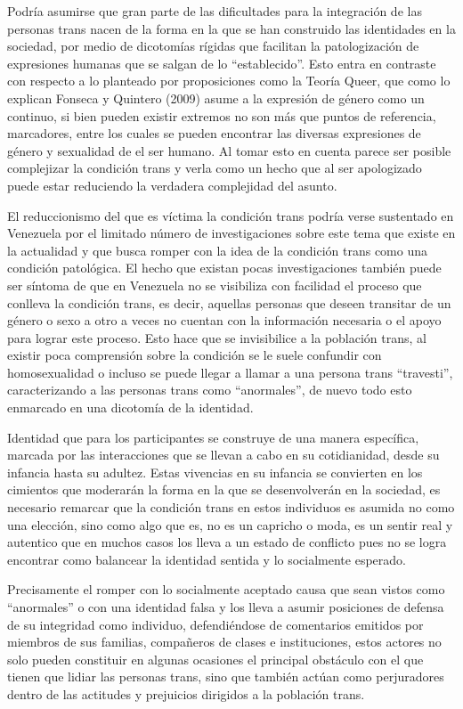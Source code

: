 Podría asumirse que gran parte de las dificultades para la integración de las
personas trans nacen de la forma en la que se han construido las identidades en
la sociedad, por medio de dicotomías rígidas que facilitan la patologización de
expresiones humanas que se salgan de lo “establecido”. Esto entra en contraste
con respecto a lo planteado por proposiciones como la Teoría Queer, que como lo
explican Fonseca y Quintero (2009) asume a la expresión de género como un
continuo, si bien pueden existir extremos no son más que puntos de referencia,
marcadores, entre los cuales se pueden encontrar las diversas expresiones de
género y sexualidad de el ser humano. Al tomar esto en cuenta parece ser posible
complejizar la condición trans y verla como un hecho que al ser apologizado
puede estar reduciendo la verdadera complejidad del asunto.

El reduccionismo del que es víctima la condición trans podría verse sustentado
en Venezuela por el limitado número de investigaciones sobre este tema que
existe en la actualidad y que busca romper con la idea de la condición trans
como una condición patológica. El hecho que existan pocas investigaciones
también puede ser síntoma de que en Venezuela no se visibiliza con facilidad el
proceso que conlleva la condición trans, es decir, aquellas personas que deseen
transitar de un género o sexo a otro a veces no cuentan con la información
necesaria o el apoyo para lograr este proceso. Esto hace que se invisibilice a
la población trans, al existir poca comprensión sobre la condición se le suele
confundir con homosexualidad o incluso se puede llegar a llamar a una persona
trans “travesti”, caracterizando a las personas trans como “anormales”, de nuevo
todo esto enmarcado en una dicotomía de la identidad.

Identidad que para los participantes se construye de una manera específica,
marcada por las interacciones que se llevan a cabo en su cotidianidad, desde su
infancia hasta su adultez.  Estas vivencias en su infancia se convierten en los
cimientos que moderarán la forma en la que se desenvolverán en la sociedad, es
necesario remarcar que la condición trans en estos individuos es asumida no como
una elección, sino como algo que es, no es un capricho o moda, es un sentir real
y autentico que en muchos casos los lleva a un estado de conflicto pues no se
logra encontrar como balancear la identidad sentida y lo socialmente esperado.

Precisamente el romper con lo socialmente aceptado causa que sean vistos como
“anormales” o con una identidad falsa y los lleva a asumir posiciones de defensa
de su integridad como individuo, defendiéndose de comentarios emitidos por
miembros de sus familias, compañeros de clases e instituciones, estos actores no
solo pueden constituir en algunas ocasiones el principal obstáculo con el que
tienen que lidiar las personas trans, sino que también actúan como perjuradores
dentro de las actitudes y prejuicios dirigidos a la población trans.


